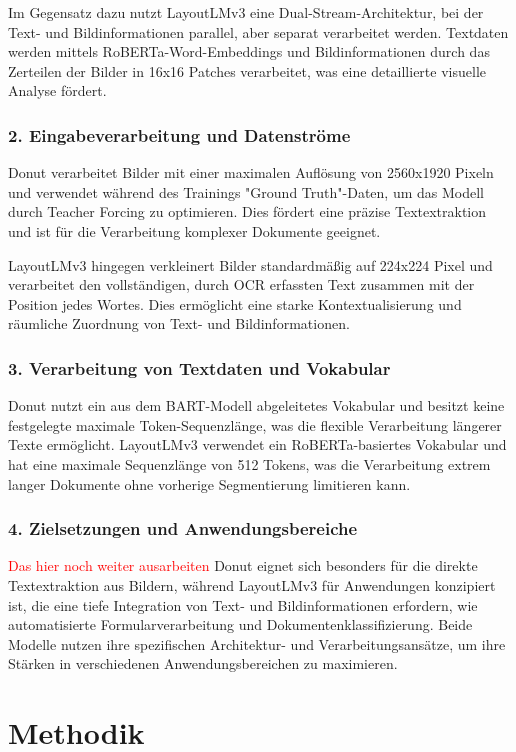 \documentclass[12pt,a4paper,twoside]{article}
\newcommand\myworries[1]{\textcolor{red}{#1}}
\begin{document}
Im Gegensatz dazu nutzt LayoutLMv3 eine Dual-Stream-Architektur, bei der Text- und Bildinformationen parallel, aber separat verarbeitet werden. Textdaten werden mittels RoBERTa-Word-Embeddings und Bildinformationen durch das Zerteilen der Bilder in 16x16 Patches verarbeitet, was eine detaillierte visuelle Analyse fördert.

\subsubsection*{2. Eingabeverarbeitung und Datenströme}
Donut verarbeitet Bilder mit einer maximalen Auflösung von 2560x1920 Pixeln und verwendet während des Trainings "Ground Truth"-Daten, um das Modell durch Teacher Forcing zu optimieren. Dies fördert eine präzise Textextraktion und ist für die Verarbeitung komplexer Dokumente geeignet.

LayoutLMv3 hingegen verkleinert Bilder standardmäßig auf 224x224 Pixel und verarbeitet den vollständigen, durch OCR erfassten Text zusammen mit der Position jedes Wortes. Dies ermöglicht eine starke Kontextualisierung und räumliche Zuordnung von Text- und Bildinformationen.

\subsubsection*{3. Verarbeitung von Textdaten und Vokabular}
Donut nutzt ein aus dem BART-Modell abgeleitetes Vokabular und besitzt keine festgelegte maximale Token-Sequenzlänge, was die flexible Verarbeitung längerer Texte ermöglicht. LayoutLMv3 verwendet ein RoBERTa-basiertes Vokabular und hat eine maximale Sequenzlänge von 512 Tokens, was die Verarbeitung extrem langer Dokumente ohne vorherige Segmentierung limitieren kann.

\subsubsection*{4. Zielsetzungen und Anwendungsbereiche}
\myworries{Das hier noch weiter ausarbeiten}
Donut eignet sich besonders für die direkte Textextraktion aus Bildern, während LayoutLMv3 für Anwendungen konzipiert ist, die eine tiefe Integration von Text- und Bildinformationen erfordern, wie automatisierte Formularverarbeitung und Dokumentenklassifizierung. Beide Modelle nutzen ihre spezifischen Architektur- und Verarbeitungsansätze, um ihre Stärken in verschiedenen Anwendungsbereichen zu maximieren.


\section{Methodik}
\end{document}
